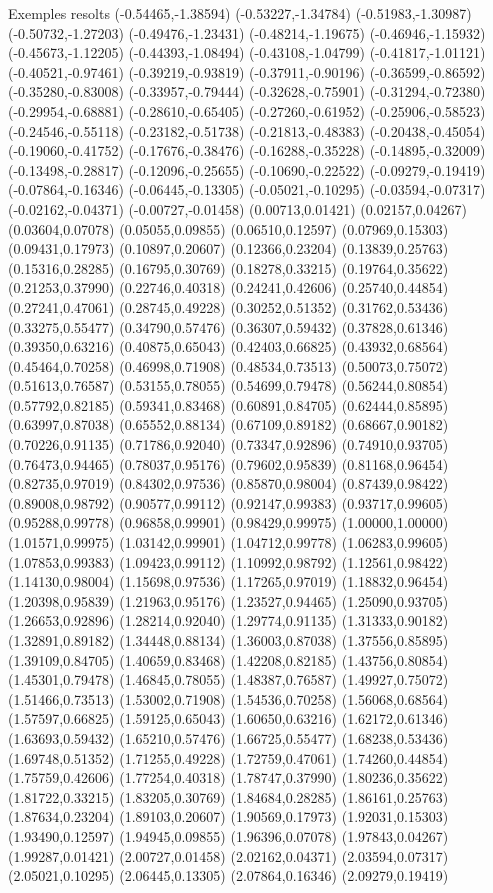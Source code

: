 \documentclass[11pt,a4paper]{article}
\begin{document}
\begin{fmex}{Exemples resolts}
(-0.54465,-1.38594) (-0.53227,-1.34784) (-0.51983,-1.30987) (-0.50732,-1.27203) (-0.49476,-1.23431) (-0.48214,-1.19675) (-0.46946,-1.15932) (-0.45673,-1.12205) (-0.44393,-1.08494) (-0.43108,-1.04799) (-0.41817,-1.01121) (-0.40521,-0.97461) (-0.39219,-0.93819) (-0.37911,-0.90196) (-0.36599,-0.86592) (-0.35280,-0.83008) (-0.33957,-0.79444) (-0.32628,-0.75901) (-0.31294,-0.72380) (-0.29954,-0.68881) (-0.28610,-0.65405) (-0.27260,-0.61952) (-0.25906,-0.58523) (-0.24546,-0.55118) (-0.23182,-0.51738) (-0.21813,-0.48383) (-0.20438,-0.45054) (-0.19060,-0.41752) (-0.17676,-0.38476) (-0.16288,-0.35228) (-0.14895,-0.32009) (-0.13498,-0.28817) (-0.12096,-0.25655) (-0.10690,-0.22522) (-0.09279,-0.19419) (-0.07864,-0.16346) (-0.06445,-0.13305) (-0.05021,-0.10295) (-0.03594,-0.07317) (-0.02162,-0.04371) (-0.00727,-0.01458) (0.00713,0.01421) (0.02157,0.04267) (0.03604,0.07078) (0.05055,0.09855) (0.06510,0.12597) (0.07969,0.15303) (0.09431,0.17973) (0.10897,0.20607) (0.12366,0.23204) (0.13839,0.25763) (0.15316,0.28285) (0.16795,0.30769) (0.18278,0.33215) (0.19764,0.35622) (0.21253,0.37990) (0.22746,0.40318) (0.24241,0.42606) (0.25740,0.44854) (0.27241,0.47061) (0.28745,0.49228) (0.30252,0.51352) (0.31762,0.53436) (0.33275,0.55477) (0.34790,0.57476) (0.36307,0.59432) (0.37828,0.61346) (0.39350,0.63216) (0.40875,0.65043) (0.42403,0.66825) (0.43932,0.68564) (0.45464,0.70258) (0.46998,0.71908) (0.48534,0.73513) (0.50073,0.75072) (0.51613,0.76587) (0.53155,0.78055) (0.54699,0.79478) (0.56244,0.80854) (0.57792,0.82185) (0.59341,0.83468) (0.60891,0.84705) (0.62444,0.85895) (0.63997,0.87038) (0.65552,0.88134) (0.67109,0.89182) (0.68667,0.90182) (0.70226,0.91135) (0.71786,0.92040) (0.73347,0.92896) (0.74910,0.93705) (0.76473,0.94465) (0.78037,0.95176) (0.79602,0.95839) (0.81168,0.96454) (0.82735,0.97019) (0.84302,0.97536) (0.85870,0.98004) (0.87439,0.98422) (0.89008,0.98792) (0.90577,0.99112) (0.92147,0.99383) (0.93717,0.99605) (0.95288,0.99778) (0.96858,0.99901) (0.98429,0.99975) (1.00000,1.00000) (1.01571,0.99975) (1.03142,0.99901) (1.04712,0.99778) (1.06283,0.99605) (1.07853,0.99383) (1.09423,0.99112) (1.10992,0.98792) (1.12561,0.98422) (1.14130,0.98004) (1.15698,0.97536) (1.17265,0.97019) (1.18832,0.96454) (1.20398,0.95839) (1.21963,0.95176) (1.23527,0.94465) (1.25090,0.93705) (1.26653,0.92896) (1.28214,0.92040) (1.29774,0.91135) (1.31333,0.90182) (1.32891,0.89182) (1.34448,0.88134) (1.36003,0.87038) (1.37556,0.85895) (1.39109,0.84705) (1.40659,0.83468) (1.42208,0.82185) (1.43756,0.80854) (1.45301,0.79478) (1.46845,0.78055) (1.48387,0.76587) (1.49927,0.75072) (1.51466,0.73513) (1.53002,0.71908) (1.54536,0.70258) (1.56068,0.68564) (1.57597,0.66825) (1.59125,0.65043) (1.60650,0.63216) (1.62172,0.61346) (1.63693,0.59432) (1.65210,0.57476) (1.66725,0.55477) (1.68238,0.53436) (1.69748,0.51352) (1.71255,0.49228) (1.72759,0.47061) (1.74260,0.44854) (1.75759,0.42606) (1.77254,0.40318) (1.78747,0.37990) (1.80236,0.35622) (1.81722,0.33215) (1.83205,0.30769) (1.84684,0.28285) (1.86161,0.25763) (1.87634,0.23204) (1.89103,0.20607) (1.90569,0.17973) (1.92031,0.15303) (1.93490,0.12597) (1.94945,0.09855) (1.96396,0.07078) (1.97843,0.04267) (1.99287,0.01421) (2.00727,0.01458) (2.02162,0.04371) (2.03594,0.07317) (2.05021,0.10295) (2.06445,0.13305) (2.07864,0.16346) (2.09279,0.19419) 
\end{fmex}
\end{document}
